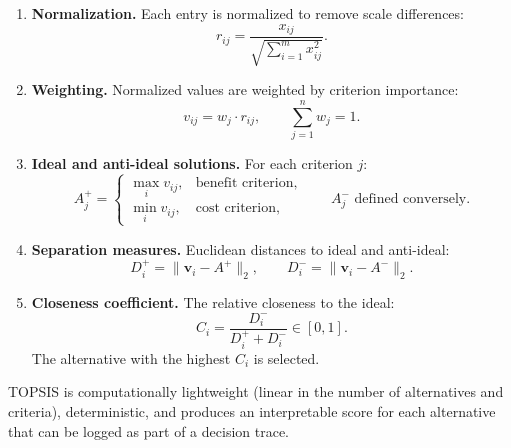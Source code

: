 \begin{enumerate}
  \item \textbf{Normalization.} Each entry is normalized to remove scale differences:
  \begin{equation}
    r_{ij} = \frac{x_{ij}}{\sqrt{\sum_{i=1}^{m} x_{ij}^2}}.
    \label{eq:topsis-norm}
  \end{equation}

  \item \textbf{Weighting.} Normalized values are weighted by criterion importance:
  \begin{equation}
    v_{ij} = w_j \cdot r_{ij}, \qquad \sum_{j=1}^{n} w_j = 1.
    \label{eq:topsis-weight}
  \end{equation}

  \item \textbf{Ideal and anti-ideal solutions.} For each criterion $j$:
  \begin{equation}
    A^{+}_j =
    \begin{cases}
      \max_i v_{ij}, & \text{benefit criterion,} \\
      \min_i v_{ij}, & \text{cost criterion,}
    \end{cases}
    \qquad
    A^{-}_j \text{ defined conversely.}
    \label{eq:topsis-ideal}
  \end{equation}

  \item \textbf{Separation measures.} Euclidean distances to ideal and anti-ideal:
  \begin{equation}
    D^{+}_i = \lVert \mathbf{v}_i - A^{+} \rVert_2, \qquad
    D^{-}_i = \lVert \mathbf{v}_i - A^{-} \rVert_2.
    \label{eq:topsis-dist}
  \end{equation}

  \item \textbf{Closeness coefficient.} The relative closeness to the ideal:
  \begin{equation}
    C_i = \frac{D^{-}_i}{D^{+}_i + D^{-}_i} \in [0,1].
    \label{eq:topsis-closeness}
  \end{equation}
  The alternative with the highest $C_i$ is selected.
\end{enumerate}

TOPSIS is computationally lightweight (linear in the number of alternatives and
criteria), deterministic, and produces an interpretable score for each alternative
that can be logged as part of a decision trace.

